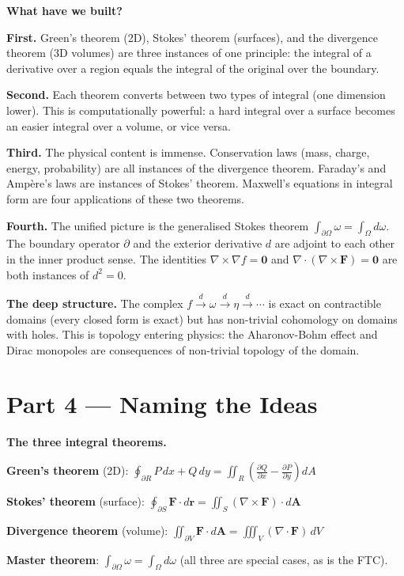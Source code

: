 \documentclass[12pt,a4paper]{article}
\begin{document}
\begin{discoverybox}
\textbf{What have we built?}

\textbf{First.} Green's theorem (2D), Stokes' theorem (surfaces), and the divergence theorem (3D volumes) are three instances of one principle: the integral of a derivative over a region equals the integral of the original over the boundary.

\textbf{Second.} Each theorem converts between two types of integral (one dimension lower). This is computationally powerful: a hard integral over a surface becomes an easier integral over a volume, or vice versa.

\textbf{Third.} The physical content is immense. Conservation laws (mass, charge, energy, probability) are all instances of the divergence theorem. Faraday's and Amp\`{e}re's laws are instances of Stokes' theorem. Maxwell's equations in integral form are four applications of these two theorems.

\textbf{Fourth.} The unified picture is the generalised Stokes theorem $\int_{\partial\Omega}\omega=\int_\Omega d\omega$. The boundary operator $\partial$ and the exterior derivative $d$ are adjoint to each other in the inner product sense. The identities $\nabla\times\nabla f=\mathbf{0}$ and $\nabla\cdot(\nabla\times\mathbf{F})=\mathbf{0}$ are both instances of $d^2=0$.

\medskip
\textbf{The deep structure.} The complex $f\xrightarrow{d}\omega\xrightarrow{d}\eta\xrightarrow{d}\cdots$ is exact on contractible domains (every closed form is exact) but has non-trivial cohomology on domains with holes. This is topology entering physics: the Aharonov-Bohm effect and Dirac monopoles are consequences of non-trivial topology of the domain.
\end{discoverybox}

\section{Part 4 \texorpdfstring{---}{--} Naming the Ideas}

\begin{namebox}
\textbf{The three integral theorems.}

\textbf{Green's theorem} (2D): $\oint_{\partial R}P\,dx+Q\,dy = \iint_R\left(\frac{\partial Q}{\partial x}-\frac{\partial P}{\partial y}\right)dA$

\textbf{Stokes' theorem} (surface): $\oint_{\partial S}\mathbf{F}\cdot d\mathbf{r} = \iint_S(\nabla\times\mathbf{F})\cdot d\mathbf{A}$

\textbf{Divergence theorem} (volume): $\iint_{\partial V}\mathbf{F}\cdot d\mathbf{A} = \iiint_V(\nabla\cdot\mathbf{F})\,dV$

\textbf{Master theorem}: $\int_{\partial\Omega}\omega = \int_\Omega d\omega$ (all three are special cases, as is the FTC).
\end{namebox}
\end{document}
